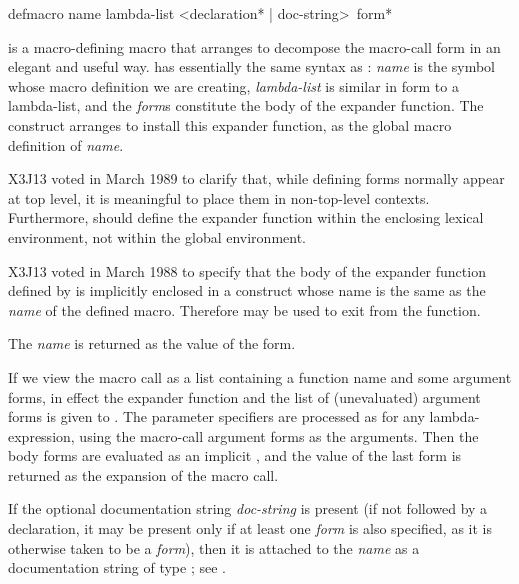 \begin{defmac}
defmacro name lambda-list <{declaration}* | doc-string> {\,form}*

 is a macro-defining macro that
arranges to decompose the macro-call form in an elegant and useful way.
 has essentially the same syntax as : \emph{name} is the
symbol whose macro definition we are creating, \emph{lambda-list} is similar in
form to a lambda-list, and
the \emph{form\/}s constitute the body of the expander function.
The  construct arranges to install this expander function,
as the global macro definition of \emph{name}.

\begin{newer}
X3J13 voted in March 1989 
to clarify that, while defining forms normally appear at top level,
it is meaningful to place them in non-top-level contexts.
Furthermore,  should define the expander function
within the enclosing lexical environment, not within the global
environment.
\end{newer}

\begin{newer}
X3J13 voted in March 1988 
to specify that the body of the expander function defined
by  is implicitly enclosed in a  construct
whose name is the same as the \emph{name} of the defined macro.
Therefore  may be used to exit from the function.
\end{newer}

The \emph{name} is returned
as the value of the  form.

If we view the 
macro call as a list containing a function name and some argument forms,
in effect the expander function and the list of (unevaluated) argument
forms is given to .
The parameter specifiers are processed as for any lambda-expression,
using the macro-call argument forms as the arguments.
Then the body forms are evaluated
as an implicit , and the value of the last form
is returned as the expansion of the macro call.

If the optional documentation string \emph{doc-string} is present (if not
followed by a declaration, it may be
present only if at least one \emph{form} is also specified, as it is
otherwise taken to be a \emph{form}), then it is attached to the \emph{name}
as a documentation string of type ; see .


\end{defmac}
